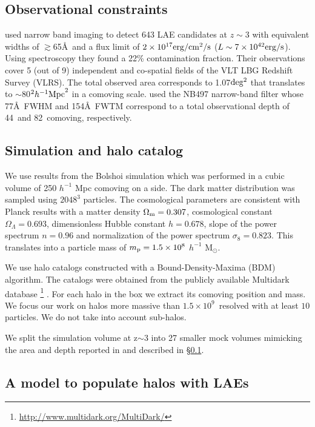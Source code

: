 \documentclass{emulateapj}
\newcommand{\hMpc}{{\ifmmode{h^{-1}{\rm Mpc}}\else{$h^{-1}$Mpc}\fi}}
\newcommand{\hMsun}{{\ifmmode{h^{-1}{\rm {M_{\odot}}}}\else{$h^{-1}{\rm{M_{\odot}}}$}\fi}}
\begin{document}
\subsection{Observational constraints}
\label{subsec:obs}
\citet{Bielby16} used narrow band imaging to detect 643 LAE candidates
at $z\sim 3$  with equivalent widths of $\gtrsim$65\AA\ and a flux limit
of $2\times10^{17}{\rm erg/cm^2/s}$ ($L\sim 7\times10^{42}{\rm erg/s} $). 
Using spectroscopy they found a 22\% contamination fraction.
Their observations cover 5 (out of 9) independent and co-spatial
fields of the VLT LBG Redshift Survey (VLRS).  
The  total observed  area corresponds to 1.07$\rm deg^2$ that translates to
$\sim$80$^2\hMpc^2$ in a comoving scale. 
\citet{Bielby16} used the NB497  narrow-band filter whose 77\AA\ FWHM
and 154\AA\ FWTM correspond to a total observational depth of
44\hMpc\  and 82\hMpc\ comoving, respectively. 


\subsection{Simulation and halo catalog}
\label{subsec:sim}

We use results from the Bolshoi simulation \citep{Bolshoi,BolshoiP} which was
performed in a cubic volume of 250 $h^{-1}$ Mpc comoving on a side. 
The dark matter distribution was sampled using  $2048^{3}$
particles. 
The cosmological parameters are consistent with Planck
results \citep{Planck2014} with a matter density 
$\Omega_{\rm m} = 0.307$, cosmological constant
$\Omega_{\Lambda}=0.693$, dimensionless Hubble constant $h=0.678$, slope
of the power spectrum  $n=0.96$ and normalization of the power
spectrum $\sigma_{8}=0.823$.  
This translates into a particle mass of  $m_{\rm p}=1.5\times 10^{8}$
$h^{-1}$ M$_{\odot}$.   


We use halo catalogs constructed with a Bound-Density-Maxima (BDM)
algorithm. 
The catalogs were obtained from the publicly available Multidark
database  \footnote{\url{http://www.multidark.org/MultiDark/}}
\citep{MultiDark}. 
For each  halo in the box we extract its comoving position and mass.  
We focus our work on halos more massive than $1.5\times
10^{9}$\hMsun\ resolved with at least  $10$ particles. 
We do not take into account sub-halos.


We split the simulation volume at z$\sim$3 into  27 smaller mock
volumes mimicking the  area and depth reported in \citet{Bielby16} and
described in \S \ref{subsec:obs}.   


\subsection{A model to populate halos with LAEs}
\label{subsec:mocks}
\end{document}
